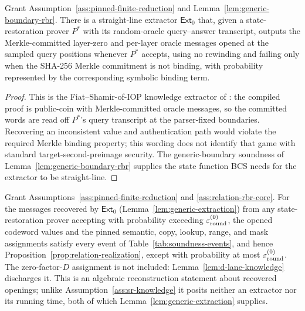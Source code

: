 \begin{lemma}
\label{lem:generic-extraction}
Grant Assumption~\ref{ass:pinned-finite-reduction} and
Lemma~\ref{lem:generic-boundary-rbr}.  There is a straight-line extractor
\(\mathsf{Ext}_0\) that, given a state-restoration prover \(P^\ast\) with its
random-oracle query--answer transcript, outputs the Merkle-committed layer-zero
and per-layer oracle messages opened at the sampled query positions whenever
\(P^\ast\) accepts, using no rewinding and failing only when the SHA-256
Merkle commitment is not binding, with probability represented by the
corresponding symbolic binding term.
\end{lemma}

\begin{proof}
This is the Fiat--Shamir-of-IOP knowledge extractor of
\citet{BenSassonChiesaSpooner2016}: the compiled proof is public-coin with
Merkle-committed oracle messages, so the committed words are read off
\(P^\ast\)'s query transcript at the parser-fixed boundaries.  Recovering an
inconsistent value and authentication path would violate the required Merkle
binding property; this wording does not identify that game with standard
target-second-preimage security.  The
generic-boundary soundness of Lemma~\ref{lem:generic-boundary-rbr} supplies the
state function BCS needs for the extractor to be straight-line.
\end{proof}

\begin{assumption}
\label{ass:relation-knowledge-core}
Grant Assumptions~\ref{ass:pinned-finite-reduction} and
\ref{ass:relation-rbr-core}.  For the messages recovered by \(\mathsf{Ext}_0\)
(Lemma~\ref{lem:generic-extraction}) from any state-restoration prover
accepting with probability exceeding \(\varepsilon_{\rm round}^{(0)}\), the
opened codeword values and the pinned semantic, copy, lookup, range, and mask
assignments satisfy every event of
Table~\ref{tab:soundness-events}, and hence
Proposition~\ref{prop:relation-realization}, except with probability at most
\(\varepsilon_{\rm round}^{(0)}\).  The zero-factor-\(D\) assignment is not
included: Lemma~\ref{lem:d-lane-knowledge} discharges it.  This is an algebraic reconstruction statement about
recovered openings; unlike Assumption~\ref{ass:sr-knowledge} it posits neither
an extractor nor its running time, both of which
Lemma~\ref{lem:generic-extraction} supplies.
\end{assumption}

